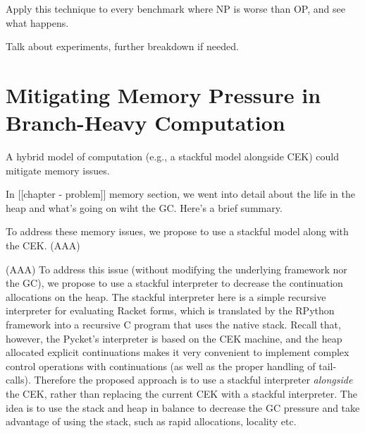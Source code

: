     \begin{show-experiment}
      Apply this technique to every benchmark where NP is worse than OP, and see what happens.
    \end{show-experiment}

    \begin{paragraph-here}
      Talk about experiments, further breakdown if needed.
    \end{paragraph-here}

	\section{Mitigating Memory Pressure in Branch-Heavy Computation}
		\begin{mainpoint}
			A hybrid model of computation (e.g., a stackful model alongside CEK) could mitigate memory issues.
		\end{mainpoint}

    \begin{paragraph-here}
       In [[chapter - problem]] memory section, we went into detail about the life in the heap and what's going on wiht the GC. Here's a brief summary.
    \end{paragraph-here}

    \begin{paragraph-here}
      To address these memory issues, we propose to use a stackful model along with the CEK. (AAA)
    \end{paragraph-here}

    (AAA) To address this issue (without modifying the underlying framework nor
    the GC), we propose to use a stackful interpreter to decrease the continuation allocations on the heap. The stackful interpreter here is
    a simple recursive interpreter for evaluating Racket forms, which is
    translated by the RPython framework into a recursive C program that
    uses the native stack. Recall that, however, the Pycket's interpreter
    is based on the CEK machine, and the heap allocated explicit
    continuations makes it very convenient to implement complex control
    operations with continuations (as well as the proper handling of
    tail-calls). Therefore the proposed approach is to use a stackful
    interpreter \emph{alongside} the CEK, rather than replacing the
    current CEK with a stackful interpreter. The idea is to use the stack
    and heap in balance to decrease the GC pressure and take advantage of
    using the stack, such as rapid allocations, locality etc.


